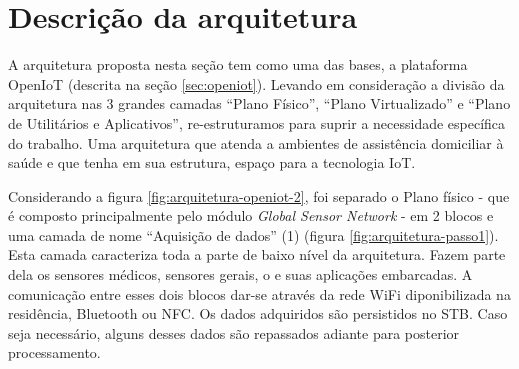 


\section{Descrição da arquitetura}
\label{sec:descricao-solucao}

A arquitetura proposta nesta seção tem como uma das bases, a plataforma OpenIoT
(descrita na seção \vref{sec:openiot}). Levando em consideração a divisão da
arquitetura nas 3 grandes camadas ``Plano Físico'', ``Plano Virtualizado'' e
``Plano de Utilitários e Aplicativos'', re-estruturamos para suprir a
necessidade específica do trabalho. Uma arquitetura que atenda a ambientes de
assistência domiciliar à saúde e que tenha em sua estrutura, espaço para a
tecnologia IoT.

Considerando a figura \ref{fig:arquitetura-openiot-2}, foi separado o Plano físico -
que é composto principalmente pelo módulo \textit{Global Sensor Network} -
em 2 blocos e uma camada de nome ``Aquisição de dados'' (1) (figura
\ref{fig:arquitetura-passo1}). Esta camada caracteriza toda a parte de baixo
nível da arquitetura. Fazem parte dela os sensores médicos, sensores gerais, o
\stb[] e suas aplicações embarcadas. A comunicação entre esses dois blocos
dar-se através da rede WiFi diponibilizada na residência, Bluetooth ou NFC. Os
dados adquiridos são persistidos no STB. Caso seja necessário, alguns desses
dados são repassados adiante para posterior processamento. 

